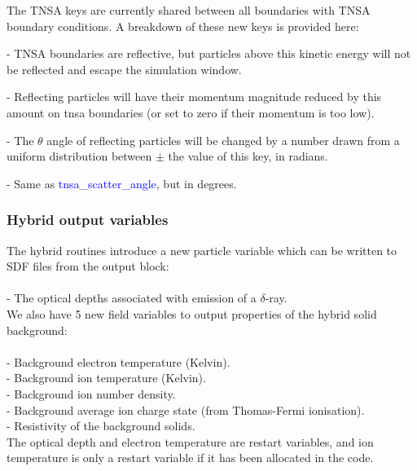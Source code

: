 \documentclass[12pt]{article}
\numberwithin{equation}{section}
\begin{document}
The TNSA keys are currently shared between all boundaries with TNSA boundary conditions. A breakdown of these new keys is provided here:

\bigskip {\large\textcolor{blue}{tnsa\_escape\_KE}} - TNSA boundaries are reflective, but particles above this kinetic energy will not be reflected and escape the simulation window.

\bigskip {\large\textcolor{blue}{tnsa\_p\_loss}} - Reflecting particles will have their momentum magnitude reduced by this amount on tnsa boundaries (or set to zero if their momentum is too low).

\bigskip {\large\textcolor{blue}{tnsa\_scatter\_angle}} - The $\theta$ angle of reflecting particles will be changed by a number drawn from a uniform distribution between $\pm$ the value of this key, in radians.

\bigskip {\large\textcolor{blue}{tnsa\_scatter\_deg}} - Same as \textcolor{blue}{tnsa\_scatter\_angle}, but in degrees.

\subsubsection{Hybrid output variables}

The hybrid routines introduce a new particle variable which can be written to SDF files from the output block:
\\
\\
\indent\bigskip {\large\textcolor{blue}{delta\_optical\_depth}} - The optical depths associated with emission of a $\delta$-ray.
\\
We also have 5 new field variables to output properties of the hybrid solid background:
\\
\\
\indent\bigskip {\large\textcolor{blue}{hy\_Te}} - Background electron temperature (Kelvin).
\\
\indent\bigskip {\large\textcolor{blue}{hy\_Ti}} - Background ion temperature (Kelvin).
\\
\indent\bigskip {\large\textcolor{blue}{hy\_ni}} - Background ion number density.
\\
\indent\bigskip {\large\textcolor{blue}{hy\_ion\_charge}} - Background average ion charge state (from Thomas-Fermi ionisation).
\\
\indent\bigskip {\large\textcolor{blue}{hy\_resistivity}} - Resistivity of the background solids.
\\
The optical depth and electron temperature are restart variables, and ion temperature is only a restart variable if it has been allocated in the code.
\end{document}

